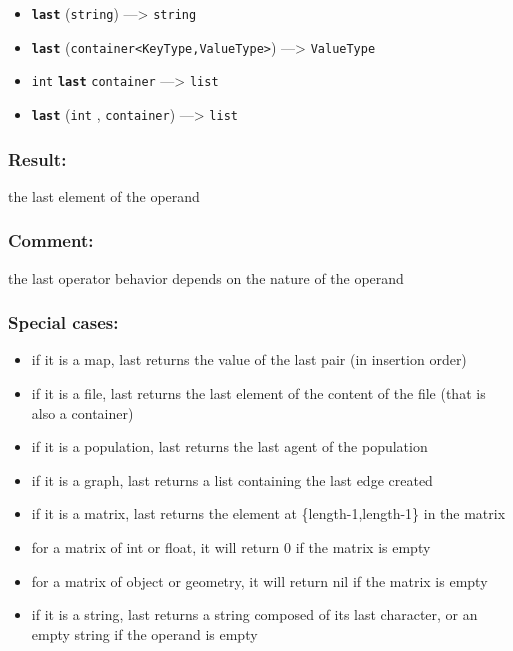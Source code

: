 \documentclass[]{book}
\providecommand{\tightlist}{%
  \setlength{\itemsep}{0pt}\setlength{\parskip}{0pt}}
\theoremstyle{definition}
\theoremstyle{definition}
\theoremstyle{definition}
\theoremstyle{remark}
\begin{document}
\begin{itemize}
\tightlist
\item
  \textbf{\texttt{last}} (\texttt{string}) ---\textgreater{}
  \texttt{string}
\item
  \textbf{\texttt{last}}
  (\texttt{container\textless{}KeyType,ValueType\textgreater{}})
  ---\textgreater{} \texttt{ValueType}
\item
  \texttt{int} \textbf{\texttt{last}} \texttt{container}
  ---\textgreater{} \texttt{list}
\item
  \textbf{\texttt{last}} (\texttt{int} , \texttt{container})
  ---\textgreater{} \texttt{list}
\end{itemize}

\subsubsection{Result:}\label{result-306}

the last element of the operand

\subsubsection{Comment:}\label{comment-56}

the last operator behavior depends on the nature of the operand

\subsubsection{Special cases:}\label{special-cases-84}

\begin{itemize}
\tightlist
\item
  if it is a map, last returns the value of the last pair (in insertion
  order)\\
\item
  if it is a file, last returns the last element of the content of the
  file (that is also a container)\\
\item
  if it is a population, last returns the last agent of the population\\
\item
  if it is a graph, last returns a list containing the last edge
  created\\
\item
  if it is a matrix, last returns the element at \{length-1,length-1\}
  in the matrix\\
\item
  for a matrix of int or float, it will return 0 if the matrix is
  empty\\
\item
  for a matrix of object or geometry, it will return nil if the matrix
  is empty\\
\item
  if it is a string, last returns a string composed of its last
  character, or an empty string if the operand is empty
\end{itemize}
\end{document}
